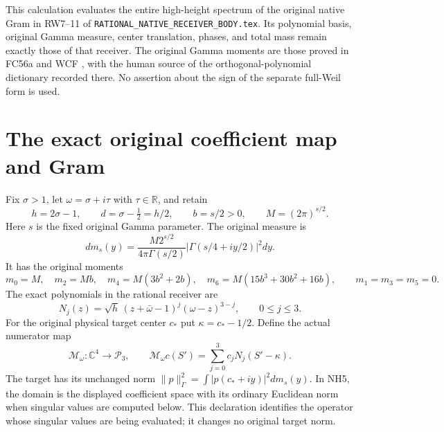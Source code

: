 \documentclass[11pt]{article}
\newcommand{\C}{\mathbb C}
\newcommand{\R}{\mathbb R}
\begin{document}
This calculation evaluates the entire high-height spectrum of the
original native Gram in RW7--11 of
\texttt{RATIONAL\_NATIVE\_RECEIVER\_BODY.tex}. Its polynomial
basis, original Gamma measure, center translation, phases, and total
mass remain exactly those of that receiver. The original Gamma
moments are those proved in FC56a and WCF \cite{WCF}, with the
human source of the orthogonal-polynomial dictionary recorded there.
No assertion about the sign of the separate full-Weil form is used.

\section{The exact original coefficient map and Gram}
Fix $\sigma>1$, let $\omega=\sigma+i\tau$ with $\tau\in\R$,
and retain
\[
 h=2\sigma-1,\qquad d=\sigma-\tfrac12=h/2,\qquad
 b=s/2>0,\qquad M=(2\pi)^{s/2}.
 \tag{NH1}
\]
Here $s$ is the fixed original Gamma parameter. The original measure is
\[
 dm_s(y)=\frac{M2^{s/2}}{4\pi\Gamma(s/2)}
               |\Gamma(s/4+iy/2)|^2dy.
 \tag{NH2}
\]
It has the original moments
\[
 m_0=M,\quad m_2=Mb,\quad m_4=M(3b^2+2b),\quad
 m_6=M(15b^3+30b^2+16b),\qquad m_1=m_3=m_5=0.
 \tag{NH3}
\]
The exact polynomials in the rational receiver are
\[
 N_j(z)=\sqrt h\,(z+\bar\omega-1)^j(\omega-z)^{3-j},
 \qquad 0\le j\le3.
 \tag{NH4}
\]
For the original physical target center $c_*$ put
$\kappa=c_*-1/2$. Define the actual numerator map
\[
 \mathcal M_\omega:\C^4\longrightarrow\mathcal P_3,
 \qquad \mathcal M_\omega c(S')=\sum_{j=0}^3c_jN_j(S'-\kappa).
 \tag{NH5}
\]
The target has its unchanged norm
$\|p\|_\Gamma^2=\int|p(c_*+iy)|^2dm_s(y)$.
In NH5, the domain is the displayed coefficient space with its
ordinary Euclidean norm when singular values are computed below.
This declaration identifies the operator whose singular values are
being evaluated; it changes no original target norm.
\end{document}
